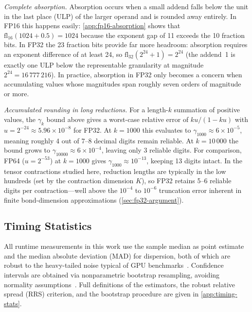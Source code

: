 \emph{Complete absorption.}
Absorption occurs when a small addend falls below the unit in the last place
(ULP) of the larger operand and is rounded away entirely.
In FP16 this happens easily: \cref{app:fp16-absorption} shows that
$\mathrm{fl}_{16}(1024 + 0.5) = 1024$ because the exponent gap of 11 exceeds
the 10 fraction bits. In FP32 the 23 fraction bits provide far more headroom:
absorption requires an exponent difference of at least 24, so
$\mathrm{fl}_{32}(2^{24} + 1) = 2^{24}$ (the addend~1 is exactly one ULP
below the representable granularity at magnitude $2^{24} = 16\,777\,216$).
In practice, absorption in FP32 only becomes a concern when accumulating
values whose magnitudes span roughly seven orders of magnitude or more.

\emph{Accumulated rounding in long reductions.}
For a length-$k$ summation of positive values, the $\gamma_k$ bound above
gives a worst-case relative error of $ku/(1-ku)$ with $u = 2^{-24} \approx
5.96 \times 10^{-8}$ for FP32. At $k = 1000$
this evaluates to $\gamma_{1000} \approx 6 \times 10^{-5}$, meaning roughly
4 out of 7--8 decimal digits remain reliable. At $k = 10\,000$ the bound
grows to $\gamma_{10000} \approx 6 \times 10^{-4}$, leaving only 3 reliable
digits. For comparison, FP64 ($u = 2^{-53}$) at $k = 1000$ gives
$\gamma_{1000} \approx 10^{-13}$, keeping 13 digits intact.
In the tensor contractions studied here, reduction lengths are typically in
the low hundreds (set by the contraction dimension $K$), so FP32 retains
5--6 reliable digits per contraction---well above the $10^{-4}$ to
$10^{-6}$ truncation error inherent in finite bond-dimension
approximations (\cref{sec:fp32-argument}).

\subsection{Timing Statistics}

All runtime measurements in this work use the sample median as point estimate
and the median absolute deviation (MAD) for dispersion, both of which are
robust to the heavy-tailed noise typical of GPU
benchmarks~\cite{jain1991art,kalibera2013rigorous}. Confidence intervals are
obtained via nonparametric bootstrap resampling, avoiding normality
assumptions~\cite{efron1994bootstrap}. Full definitions of the estimators, the
robust relative spread (RRS) criterion, and the bootstrap procedure are given
in \cref{app:timing-stats}.
